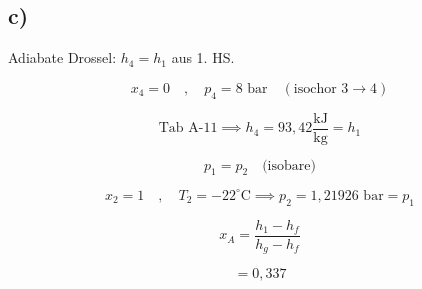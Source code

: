 

\subsection*{c)}
Adiabate Drossel: \( h_4 = h_1 \) aus 1. HS.

\[
x_4 = 0 \quad , \quad p_4 = 8 \text{ bar} \quad (\text{isochor 3} \rightarrow 4)
\]

\[
\text{Tab A-11} \implies h_4 = 93,42 \frac{\text{kJ}}{\text{kg}} = h_1
\]

\[
p_1 = p_2 \quad \text{(isobare)}
\]

\[
x_2 = 1 \quad , \quad T_2 = -22^\circ \text{C} \implies p_2 = 1,21926 \text{ bar} = p_1
\]

\[
x_A = \frac{h_1 - h_f}{h_g - h_f}
\]

\[
= 0,337
\]